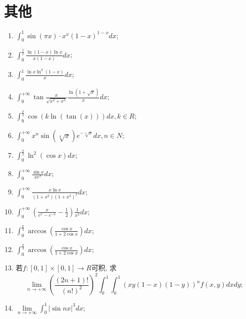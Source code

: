 \documentclass[12pt,a4paper,openany]{book}
\begin{document}
\chapter{其他}
\begin{enumerate}
\item $\displaystyle\int_{0}^{1}{\sin(\pi{x}) \cdot x^x(1 - x)^{1 - x}dx}$;

\item $\displaystyle\int_{0}^{\frac{1}{2}}{\frac{\ln(1 - x)\ln{x}}{x(1 - x)}dx}$;

\item $\displaystyle\int_{0}^{1}{\frac{\ln{x}\ln^2(1 - x)}{x}dx}$;

\item $\displaystyle\int_{0}^{+\infty}{\tan{\frac{x}{\sqrt{x^2 + x^3}}}\frac{\ln(1 + \sqrt{x})}{x}dx}$;

\item $\displaystyle\int_{0}^{\frac{\pi}{2}}{\cos(k\ln(\tan(x)))dx}, k \in R$;

\item $\displaystyle\int_{0}^{+\infty}{x^n\sin(\sqrt[4]{x})e^{-\sqrt[4]{x}}dx, n \in N}$;

\item $\displaystyle\int_{0}^{\frac{\pi}{2}}{\ln^2(\cos{x})dx}$;

\item $\displaystyle\int_{0}^{+\infty}{\frac{\sin{x}}{xe^x}dx}$;

\item $\displaystyle\int_{0}^{+\infty}{\frac{x\ln{x}}{(1 + x^2)(1 + x^3)^2}dx}$;

\item $\displaystyle\int_{0}^{+\infty}{(\frac{x}{e^x - e^{-x}} - \frac{1}{2})\frac{1}{x^2}dx}$;

\item $\displaystyle\int_{0}^{\frac{\pi}{2}}{\arccos(\frac{\cos{x}}{1 + 2\cos{x}})dx}$;

\item $\displaystyle\int_{0}^{\frac{\pi}{3}}{\arccos(\frac{\cos{x}}{1 + 2\cos{x}})dx}$;

\item 若$f:[0, 1] \times [0, 1] \rightarrow R$可积, 求
\[
\displaystyle\lim\limits_{n \rightarrow +\infty}{(\frac{(2n+1)!}{(n!)^2})^2}\int_{0}^{1}\int_{0}^{1}(xy(1-x)(1-y))^nf(x, y)dxdy;
\]

\item $\displaystyle\lim\limits_{n \rightarrow +\infty}{\int_{0}^{1}{|\sin{nx}|^3dx}}$;


\end{enumerate}
\end{document}
